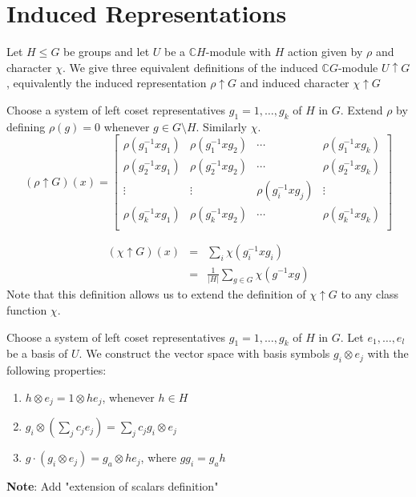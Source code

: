 \documentclass{sig-alternate}
\newenvironment{definition}[1][Definition]{\begin{trivlist}
\item[\hskip \labelsep {\bfseries #1}]}{\end{trivlist}}
\begin{document}
\section{Induced Representations}
Let $H\leq G$ be groups and let $U$ be a $\mathbb{C}H$-module with $H$ action given by $\rho$ and character $\chi$. We give three equivalent definitions of the induced $\mathbb{C}G$-module $U\uparrow G$, equivalently the induced representation $\rho\uparrow G$ and induced character $\chi\uparrow G$
\begin{definition} [Definition I1]
Choose a system of left coset representatives $g_1=1, \ldots, g_k$ of $H$ in $G$. Extend $\rho$ by defining $\rho(g) = 0$ whenever $g\in G\setminus H$. Similarly $\chi$.
\[ (\rho\uparrow G)(x) =
\begin{bmatrix}
\rho(g_1^{-1}xg_1) & \rho(g_1^{-1}xg_2) & \cdots & \rho(g_1^{-1}xg_k) \\
\rho(g_2^{-1}xg_1) & \rho(g_2^{-1}xg_2) & \cdots & \rho(g_2^{-1}xg_k) \\
\vdots & \vdots & \rho(g_i^{-1}xg_j) & \vdots \\
\rho(g_k^{-1}xg_1) & \rho(g_k^{-1}xg_2) & \cdots & \rho(g_k^{-1}xg_k) \\
\end{bmatrix}
\]

\begin{eqnarray*}
(\chi\uparrow G)(x) & = & \sum_i \chi(g_i^{-1}xg_i)  \\
& = & \frac{1}{|H|}\sum_{g\in G}  \chi(g^{-1}xg)
\end{eqnarray*}
Note that this definition allows us to extend the definition of $\chi\uparrow G$ to any class function $\chi$.
\end{definition}

\begin{definition}[Definition I2]
Choose a system of left coset representatives $g_1=1, \ldots, g_k$ of $H$ in $G$. Let $e_1, \ldots, e_l$ be a basis of $U$. We construct the vector space with basis symbols $g_i\otimes e_j$ with the following properties:
\begin{enumerate}
\item $h\otimes e_j = 1\otimes he_j$, whenever $h\in H$
\item $g_i\otimes (\sum_j c_je_j) = \sum_j c_j g_i \otimes e_j$ 
\item $g\cdot (g_i\otimes e_j) = g_a\otimes he_j$, where $gg_i = g_ah$
\end{enumerate}
\end{definition}
{\bf Note}: Add "extension of scalars definition"
\end{document}
